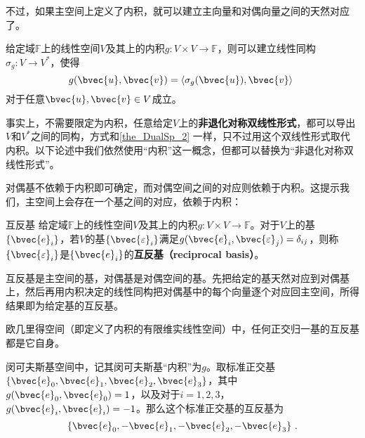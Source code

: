不过，如果主空间上定义了内积，就可以建立主向量和对偶向量之间的天然对应了。

\begin{theorem}{}\label{the_DualSp_2}
给定域$\mathbb{F}$上的线性空间$V$及其上的内积$g:V\times V\to \mathbb{F}$，则可以建立线性同构$\sigma_g: V\to V^*$，使得
\begin{equation}
g(\bvec{u}, \bvec{v}) = \langle \sigma_g(\bvec{u}) , \bvec{v} \rangle~
\end{equation}
对于任意$\bvec{u}, \bvec{v}\in V$成立。

\end{theorem}

事实上，不需要限定为内积，任意给定$V$上的\textbf{非退化对称双线性形式}，都可以导出$V$和$V^*$之间的同构，方式和\autoref{the_DualSp_2} 一样，只不过用这个双线性形式取代内积。以下论述中我们依然使用“内积”这一概念，但都可以替换为“非退化对称双线性形式”。

对偶基不依赖于内积即可确定，而对偶空间之间的对应则依赖于内积。这提示我们，主空间上会存在一个基之间的对应，依赖于内积：

\begin{definition}{互反基}
给定域$\mathbb{F}$上的线性空间$V$及其上的内积$g:V\times V\to \mathbb{F}$。对于$V$上的基$\{\bvec{e}_i\}$，若$V$的基$\{\bvec{\varepsilon}_i\}$满足$g(\bvec{e}_i, \bvec{\varepsilon}_j)=\delta_{ij}$，则称$\{\bvec{\varepsilon}_i\}$是$\{\bvec{e}_i\}$的\textbf{互反基（reciprocal basis）}。

\end{definition}

互反基是主空间的基，对偶基是对偶空间的基。先把给定的基天然对应到对偶基上，然后再用内积决定的线性同构把对偶基中的每个向量逐个对应回主空间，所得结果即为给定基的互反基。

\begin{example}{}
欧几里得空间（即定义了内积的有限维实线性空间）中，任何正交归一基的互反基都是它自身。

闵可夫斯基空间中，记其闵可夫斯基“内积”为$g$。取标准正交基$\{\bvec{e}_0, \bvec{e}_1, \bvec{e}_2, \bvec{e}_3\}$，其中$g(\bvec{e}_0, \bvec{e}_0)=1$，以及对于$i=1, 2, 3$，$g(\bvec{e}_i, \bvec{e}_i)=-1$。那么这个标准正交基的互反基为
\begin{equation}
\{\bvec{e}_0, -\bvec{e}_1, -\bvec{e}_2, -\bvec{e}_3\}~. 
\end{equation}

\end{example}


